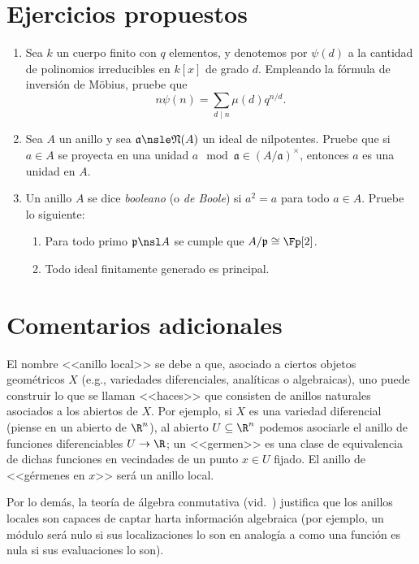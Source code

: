 \documentclass[11pt, reqno]{amsart}
\begin{document}
\section{Ejercicios propuestos}
\begin{enumerate}
	\item Sea $k$ un cuerpo finito con $q$ elementos, y denotemos por $\psi(d)$ a la cantidad de polinomios
		irreducibles en $k[x]$ de grado $d$.
		Empleando la fórmula de inversión de Möbius, pruebe que
		\[
			n \psi(n) = \sum_{d \mid n} \mu(d)q^{n/d}.
		\]
	\item Sea $A$ un anillo y sea $\mathfrak{a} \nsle \mathfrak{N}(A)$ un ideal de nilpotentes.
		Pruebe que si $a \in A$ se proyecta en una unidad $a \mod{\mathfrak{a}} \in (A/\mathfrak{a})^\times$,
		entonces $a$ es una unidad en $A$.
	\item\label{bool_ring}
		Un anillo $A$ se dice \emph{booleano} (o \emph{de Boole}) si $a^2 = a$ para todo $a \in A$.
		Pruebe lo siguiente:
		\begin{enumerate}
			\item Para todo primo $\mathfrak{p} \nsl A$ se cumple que $A/\mathfrak{p} \cong \Fp[2]$.
			\item Todo ideal finitamente generado es principal.
		\end{enumerate}
\end{enumerate}

\section{Comentarios adicionales}
El nombre <<anillo local>> se debe a que, asociado a ciertos objetos geométricos $X$ (e.g., variedades diferenciales,
analíticas o algebraicas), uno puede construir lo que se llaman <<haces>> que consisten de anillos naturales asociados a
los abiertos de $X$.
Por ejemplo, si $X$ es una variedad diferencial (piense en un abierto de $\R^n$), al abierto $U \subseteq \R^n$ podemos
asociarle el anillo de funciones diferenciables $U \to \R$; un <<germen>> es una clase de equivalencia de dichas
funciones en vecindades de un punto $x \in U$ fijado.
El anillo de <<gérmenes en $x$>> será un anillo local.

Por lo demás, la teoría de álgebra conmutativa (vid.\ \cite{atiyah:commutative}) justifica que los anillos locales son
capaces de captar harta información algebraica (por ejemplo, un módulo será nulo si sus localizaciones lo son en
analogía a como una función es nula si sus evaluaciones lo son).
\end{document}
